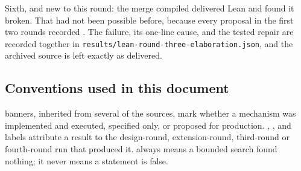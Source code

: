 Sixth, and new to this round: the merge compiled delivered Lean and found it
broken. That had not been possible before, because every proposal in the first
two rounds recorded . The failure, its one-line cause, and the
tested repair are recorded together in
\texttt{results/lean-round-three-elaboration.json}, and the archived source is
left exactly as delivered.

\subsection{Conventions used in this document}

 banners, inherited from several of the
sources, mark whether a mechanism was implemented and executed, specified only,
or proposed for production. , ,  and  labels
attribute a result to the design-round, extension-round, third-round or
fourth-round run that produced it. \unknown{} always means a bounded search found nothing; it never
means a statement is false.
